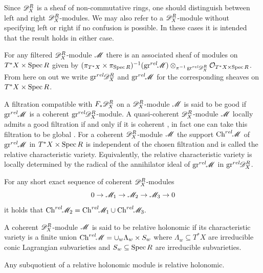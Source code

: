 Since $\mathscr{D}_X^R$ is a sheaf of non-commutative rings, one should distinguish between left and right $\mathscr{D}_X^R$-modules.
We may also refer to a $\mathscr{D}_X^R$-module without specifying left or right if no confusion is possible. In these cases it is intended that the result holds in either case.

For any filtered $\mathscr{D}_X^R$-module $\mathscr{M}$ there is an associated sheaf of modules on $T^*X\times \operatorname{Spec} R$ given by
$(\pi_{T^*X}\times \pi_{\operatorname{Spec} R})^{-1}(\operatorname{gr}^{rel}\mkern-5mu\mathscr{M})\allowbreak\otimes_{\pi^{-1}\operatorname{gr}^{rel}\mkern-5mu\mathscr{D}_X^R} \mathcal{O}_{T^*X\times \operatorname{Spec} R}$.
From here on out we write $\operatorname{gr}^{rel}\mkern-5mu\mathscr{D}_X^R$ and $\operatorname{gr}^{rel}\mkern-5mu \mathscr{M}$ for the corresponding sheaves on $T^*X\times \operatorname{Spec} R$.

A filtration  compatible with $F_* \mathscr{D}_X^R$ on a $\mathscr{D}_X^R$-module $\mathscr{M}$ is said to be good if $\operatorname{gr}^{rel}\mkern-5mu\mathscr{M}$ is a coherent $\operatorname{gr}^{rel}\mkern-5mu\mathscr{D}_X^R$-module.
A quasi-coherent $\mathscr{D}_X^R$-module $\mathscr{M}$ locally admits a good filtration if and only if it is coherent \cite[Corollary D.1.2]{hotta2007d}, in fact one can take this filtration to be global \cite[Proof of Theorem 2.1.3]{hotta2007d}.
For a coherent $\mathscr{D}_X^R$-module $\mathscr{M}$ the support $\operatorname{Ch}^{rel}\mkern-5mu\mathscr{M}$ of $\operatorname{gr}^{rel}\mkern-5mu\mathscr{M}$ in $T^*X\times \operatorname{Spec} R$ is independent of the chosen filtration \cite[Lemma D.3.1.]{hotta2007d} and is called the relative characteristic variety.
Equivalently, the relative characteristic variety is locally determined by the radical of the annihilator ideal of $\operatorname{gr}^{rel}\mkern-5mu \mathscr{M}$ in $\operatorname{gr}^{rel}\mkern-5mu\mathscr{D}_X^R$.
\begin{proposition}{\cite[Lemma 3.2.2]{budur2020zeroI}}\label{prop: SESBehaviourChrel}
  For any short exact sequence of coherent $\mathscr{D}_X^R$-modules
  $$0\to \mathscr{M}_1\to \mathscr{M}_2 \to \mathscr{M}_3 \to 0 $$
  it holds that $\operatorname{Ch}^{rel}\mkern-5mu\mathscr{M}_2 = \operatorname{Ch}^{rel}\mkern-5mu\mathscr{M}_1 \cup \operatorname{Ch}^{rel}\mkern-5mu\mathscr{M}_3.$
\end{proposition}
\begin{definition}\label{def: RelHolonomic}
  A coherent $\mathscr{D}_X^R$-module $\mathscr{M}$ is said to be relative holonomic if its characteristic variety is a finite union $\operatorname{Ch}^{rel}\mkern-5mu\mathscr{M} = \cup_w \Lambda_w \times S_w$ where $\Lambda_w\subseteq T^* X$ are irreducible conic Lagrangian subvarieties and $S_w\subseteq \operatorname{Spec} R$ are irreducible subvarieties.
\end{definition}

\begin{proposition}{\cite[Lemma 3.2.4]{budur2020zeroI}}\label{prop: SubquotientRelHol}
  Any subquotient of a relative holonomic module is relative holonomic.
\end{proposition}

